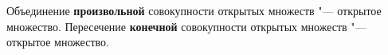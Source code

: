 
    Объединение \textbf{произвольной} совокупности открытых множеств "--- открытое множество. Пересечение \textbf{конечной} совокупности открытых множеств "--- открытое множество.
